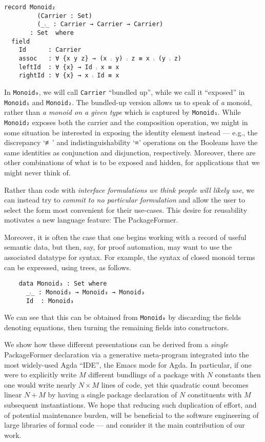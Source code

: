 \documentclass[sigplan,screen]{acmart}
\begin{document}
\begin{verbatim}
record Monoid₂
         (Carrier : Set)
         (_⨾_ : Carrier → Carrier → Carrier)
       : Set  where
  field
    Id      : Carrier
    assoc   : ∀ {x y z} → (x ⨾ y) ⨾ z ≡ x ⨾ (y ⨾ z)
    leftId  : ∀ {x} → Id ⨾ x ≡ x
    rightId : ∀ {x} → x ⨾ Id ≡ x
\end{verbatim}

\vspace{0.3em}\noindent
In \texttt{Monoid₀}, we will call \texttt{Carrier} “bundled up”,
while we call it “exposed” in \texttt{Monoid₁} and \texttt{Monoid₂}.
The bundled-up version allows us to speak of \emph{a}
monoid, rather than \emph{a monoid on a given type} which is captured by \texttt{Monoid₁}.
While \texttt{Monoid₂} exposes both the carrier and the composition operation,
we might in some situation be interested
in exposing the identity element instead
--- e.g., the discrepancy ‘≢’ and indistinguishability ‘≡’ operations
on the Booleans
have the same identities as conjunction and disjunction, respectively.
Moreover, there are other combinations of what is to be exposed and hidden,
for applications that we might never think of.

Rather than code with \emph{interface formulations we think people will likely use}, we can
instead try to \emph{commit to no particular formulation} and allow the user to select
the form most convenient for their use-cases. This desire for reusability motivates
a new language feature: The \textsf{\upshape PackageFormer}.

Moreover, it is often the case that one begins working with a record of useful
semantic data, but then, say, for proof automation, may want to use the associated
datatype for syntax. For example, the syntax of closed monoid terms can be expressed,
using trees, as follows.
\begin{verbatim}
    data Monoid₃ : Set where
      _⨾_ : Monoid₃ → Monoid₃ → Monoid₃
      Id  : Monoid₃
\end{verbatim}
\noindent
We can see that this can be
obtained from \texttt{Monoid₀} by discarding the
fields denoting equations, then turning the remaining fields into constructors.

We show how these different
presentations can be derived from a \emph{single}
\textsf{\upshape PackageFormer} declaration
via a generative meta-program integrated into the
most widely-used Agda “IDE”, the Emacs mode for Agda.
In particular,
if one were to explicitly write \(M\) different bundlings of a package
with \(N\) constants then one would write nearly \(N × M\) lines of code,
yet this quadratic count becomes linear \(N + M\) by having a single
package declaration of \(N\) constituents with \(M\) subsequent instantiations.
We hope that reducing such duplication of effort, and of potential maintenance
burden, will be beneficial to the software engineering of large libraries
of formal code --- and consider it the main contribution of our work.
\end{document}
